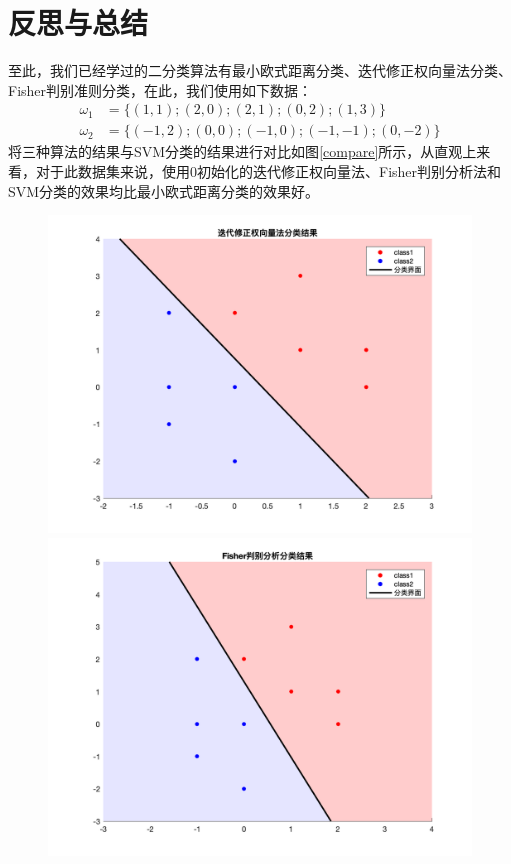 \documentclass[cn]{elegantbook}
\begin{document}
\chapter{反思与总结}
至此，我们已经学过的二分类算法有最小欧式距离分类、迭代修正权向量法分类、Fisher判别准则分类，在此，我们使用如下数据：
\begin{equation}
\begin{aligned}
\omega_1&=\{(1,1); (2,0); (2,1); (0,2); (1,3)\} \\
\omega_2&=\{(-1,2); (0,0); (-1,0); (-1,-1); (0,-2)\}
\end{aligned}
\end{equation}
将三种算法的结果与SVM分类的结果进行对比如图\ref{compare}所示，从直观上来看，对于此数据集来说，使用0初始化的迭代修正权向量法、Fisher判别分析法和SVM分类的效果均比最小欧式距离分类的效果好。
\begin{figure}[!h]
	\centering
	\begin{minipage}[h]{0.48\linewidth}
		\centering
		\includegraphics[width=\textwidth]{images/iterzeros}
	\end{minipage}
	\begin{minipage}[h]{0.48\linewidth}
		\centering
		\includegraphics[width=\textwidth]{images/fisher2res1}

\end{minipage}
\end{figure}
\end{document}
